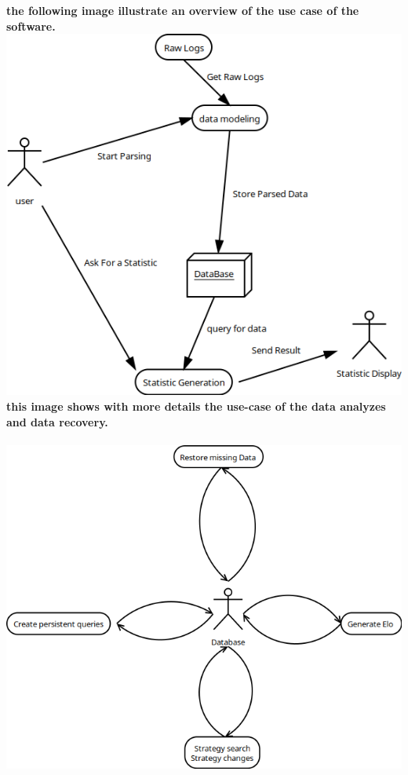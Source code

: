 \documentclass{scrreprt}
\begin{document}
\textbf{the following image illustrate an overview of the use case of the software.}\\
\includegraphics[width=\textwidth,height=\textheight,keepaspectratio]{UseCaseParsing}
\newpage
\textbf{this image shows with more details the use-case of the data analyzes and
data recovery.}\\
\\
\includegraphics[width=\textwidth,height=\textheight,keepaspectratio]{UseCaseDataMining}
\end{document}
